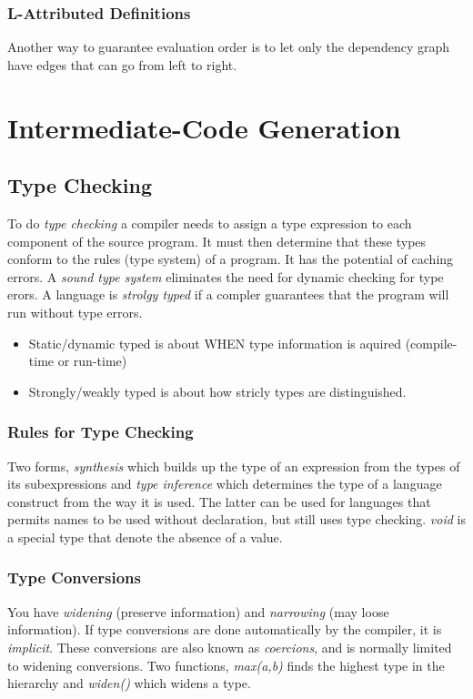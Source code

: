 \documentclass{article}
\begin{document}
\subsubsection{L-Attributed Definitions} %
\label{ssub:L-Attributed Definitions}
Another way to guarantee evaluation order is to let only the dependency graph have edges that can go from left to right. 



\section{Intermediate-Code Generation} %
\label{sec:Intermediate-Code Generation}
\subsection{Type Checking} %
\label{sub:Type Checking}
To do \emph{type checking} a compiler needs to assign a type expression to each component of the source program. It must then determine that these types conform to the rules (type system) of a program. It has the potential of caching errors. A \emph{sound type system} eliminates the need for dynamic checking for type erors. A language is \emph{strolgy typed} if a compler guarantees that the program will run without type errors.
\begin{itemize}
	\item Static/dynamic typed is about WHEN type information is aquired (compile-time or run-time)
	\item Strongly/weakly typed is about how stricly types are distinguished.
\end{itemize}
\subsubsection{Rules for Type Checking} %
\label{ssub:Rules for Type Checking}
Two forms, \emph{synthesis} which builds up the type of an expression from the types of its subexpressions and \emph{type inference} which determines the type of a language construct from the way it is used. The latter can be used for languages that permits names to be used without declaration, but still uses type checking. \emph{void} is a special type that denote the absence of a value.
\subsubsection{Type Conversions} %
\label{ssub:Type Conversions}
You have \emph{widening} (preserve information) and \emph{narrowing} (may loose information). If type conversions are done automatically by the compiler, it is \emph{implicit}. These conversions are also known as \emph{coercions}, and is normally limited to widening conversions. Two functions, \emph{max(a,b)} finds the highest type in the hierarchy and \emph{widen()} which widens a type.
\end{document}
